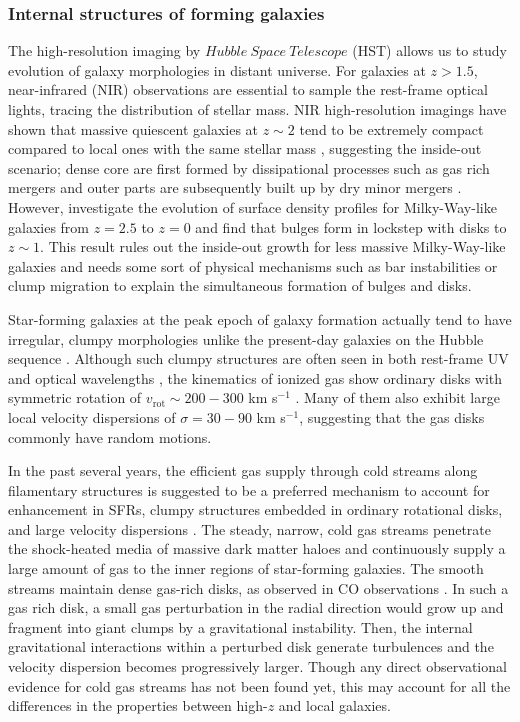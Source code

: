 \subsubsection{Internal structures of forming galaxies}

The high-resolution imaging by $Hubble\ Space\ Telescope$ (HST) allows
us to study evolution of galaxy morphologies in distant universe.
For galaxies at $z>1.5$, near-infrared (NIR) observations are essential 
to sample the rest-frame optical lights, tracing the distribution of stellar mass. 
NIR high-resolution imagings have shown that massive quiescent galaxies 
at $z\sim2$ tend to be extremely compact compared to local ones with 
the same stellar mass \citep[e.g.,][]{vandokkum08}, suggesting 
the inside-out scenario; dense core are first formed by dissipational processes 
such as gas rich mergers and outer parts are subsequently built up by 
dry minor mergers \citep[e.g.,][]{vandokkum10}. 
However, \citet{vandokkum13} 
investigate the evolution of surface density profiles for Milky-Way-like
galaxies from $z=2.5$ to $z=0$ and find that bulges form in lockstep
with disks to $z\sim1$. This result rules out the inside-out 
growth for less massive Milky-Way-like galaxies and needs some sort of
physical mechanisms such as bar instabilities or clump migration to
explain the simultaneous formation of bulges and disks.

Star-forming galaxies at the peak epoch of galaxy formation actually tend 
to have irregular, clumpy morphologies unlike the present-day galaxies 
on the Hubble sequence \citep{elmegreen05}. Although such 
clumpy structures are often seen in both rest-frame UV and optical
wavelengths \citep{guo12}, the kinematics of ionized gas show ordinary
disks with symmetric rotation of $v_\mathrm{rot}\sim200-300$ km s$^{-1}$ 
\citep{genzel06}. Many of them also exhibit large local velocity
dispersions of $\sigma=30-90$ km s$^{-1}$, suggesting that the gas disks
commonly have random motions.

In the past several years, the efficient gas supply through cold streams along 
filamentary structures is suggested to be a preferred mechanism to account for 
enhancement in SFRs, clumpy structures embedded in ordinary rotational disks, 
and large velocity dispersions \citep{dekel09}.
The steady, narrow, cold gas streams penetrate the shock-heated media of 
massive dark matter haloes and continuously supply a large amount of gas 
to the inner regions of star-forming galaxies. The smooth streams maintain 
dense gas-rich disks, as observed in CO observations \citep{tacconi10}.
In such a gas rich disk, a small gas perturbation in the radial direction would 
grow up and fragment into giant clumps by a gravitational instability.
Then, the internal gravitational interactions within a perturbed disk generate
turbulences and the velocity dispersion becomes progressively larger. 
Though any direct observational evidence for cold gas streams has not been 
found yet, this may account for all the differences in the properties between 
high-$z$ and local galaxies.

